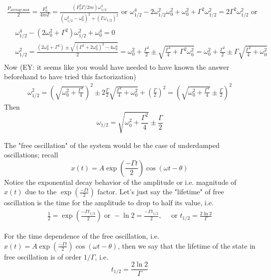 \[
\begin{gathered}
\frac{P_{\text{average,max}}}{2} = \frac{F_0^2}{4m \Gamma} = \frac{ (F_0^2 \Gamma /2m ) \omega_{1/2}^2 }{ (\omega_{1/2}^2 - \omega_0^2)^2 + (\Gamma \omega_{1/2})^2 } \text{ or } \omega_{1/2}^4 -2\omega_{1/2}^2 \omega_0^2 + \omega_0^2 + \Gamma^2 \omega_{1/2}^2 = 2\Gamma^2 \omega_{1/2}^2 \text{ or } \\
\begin{aligned}
& \omega_{1/2}^4 - (2\omega_0^2 + \Gamma^2) \omega_{1/2}^2 + \omega_0^4 = 0 \\
& \omega_{1/2}^2 = \frac{ (2 \omega_0^2 + \Gamma^2) \pm \sqrt{ ( \Gamma^2 + 2\omega_0^2)^2 - 4\omega_0^4 } }{2} = \omega_0^2 + \frac{ \Gamma^2}{2} \pm \sqrt{ \frac{\Gamma^4 }{4}  + \Gamma^2 \omega_0^2 } = \omega_0^2 + \frac{ \Gamma^2}{2} \pm \Gamma \sqrt{ \frac{\Gamma^2 }{4}  +  \omega_0^2 }
\end{aligned}
\end{gathered}
\]
Now (EY: it seems like you would have needed to have known the answer beforehand to have tried this factorization)
\[
\begin{gathered}
\omega_{1/2}^2 = \left( \sqrt{ \omega_0^2 + \frac{\Gamma^2}{4} } \right)^2 \pm 2 \frac{\Gamma}{2} \sqrt{ \frac{\Gamma^2}{4} + \omega_0^2 } + \left( \frac{\Gamma}{2} \right)^2  = \left( \sqrt{ \omega_0^2 + \frac{ \Gamma^2}{4} } \pm \frac{\Gamma}{2} \right)^2
\end{gathered}
\]
Then
\begin{equation}
\boxed{ \omega_{1/2} = \sqrt{ \omega_0^2 + \frac{\Gamma^2}{4} } \pm \frac{\Gamma}{2} }
\end{equation}

The "free oscillation" of the system would be the case of underdamped oscillations; recall
\[
x(t) = A \exp{ \left( \frac{-\Gamma t}{2} \right) }\cos{ (\omega t - \theta) }
\]
Notice the exponential decay behavior of the amplitude or i.e. magnitude of $x(t)$ due to the $\exp{ \left( \frac{-\Gamma t}{2} \right)}$ factor. Let's just say the "lifetime" of free oscillation is the time for the amplitude to drop to half its value, i.e.
\[
\begin{gathered}
\frac{1}{2} = \exp{ \left( \frac{-\Gamma t_{1/2} }{2} \right) } \text{ or } -\ln{2} = \frac{-\Gamma t_{1/2} }{2} , \quad \text{ or } t_{1/2} = \frac{2\ln{2} }{\Gamma}
\end{gathered}
\]

For the time dependence of the free oscillation, i.e. $x(t) = A \exp{ \left( \frac{-\Gamma t}{2} \right) }\cos{ (\omega t - \theta) }$, then we say that the lifetime of the state in free oscillation is of order $1/\Gamma$, i.e.
\[
t_{1/2} = \frac{2\ln{2}}{ \Gamma}
\]

